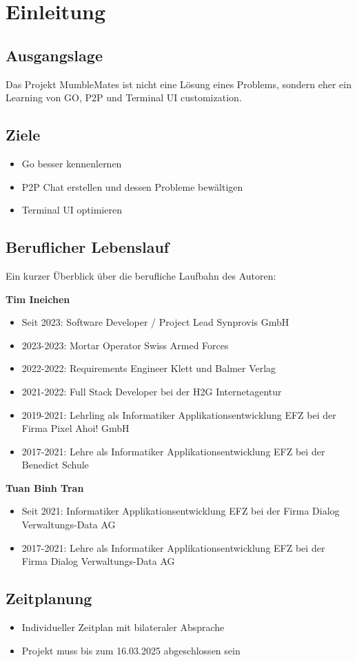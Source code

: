 \section{Einleitung}



\subsection{Ausgangslage}
    Das Projekt MumbleMates ist nicht eine Lösung eines Problems, sondern eher ein Learning von GO, P2P und Terminal UI customization.

\subsection{Ziele}
\begin{itemize}
    \item Go besser kennenlernen
    \item P2P Chat erstellen und dessen Probleme bewältigen
    \item Terminal UI optimieren
\end{itemize}

\subsection{Beruflicher Lebenslauf}

Ein kurzer Überblick über die berufliche Laufbahn des Autoren:


\textbf{Tim Ineichen}
\begin{itemize}
    \item Seit 2023: Software Developer / Project Lead Synprovis GmbH
    \item 2023-2023: Mortar Operator Swiss Armed Forces
    \item 2022-2022: Requirements Engineer Klett und Balmer Verlag
    \item 2021-2022: Full Stack Developer bei der H2G Internetagentur
    \item 2019-2021: Lehrling als Informatiker Applikationsentwicklung EFZ bei der Firma Pixel Ahoi! GmbH
    \item 2017-2021: Lehre als Informatiker Applikationsentwicklung EFZ bei der Benedict Schule
\end{itemize}

\textbf{Tuan Binh Tran}
\begin{itemize}
    \item Seit 2021: Informatiker Applikationsentwicklung EFZ bei der Firma Dialog Verwaltungs-Data AG
    \item 2017-2021: Lehre als Informatiker Applikationsentwicklung EFZ bei der Firma Dialog Verwaltungs-Data AG
\end{itemize}

\subsection{Zeitplanung}
\begin{itemize}
    \item Individueller Zeitplan mit bilateraler Absprache
    \item Projekt muss bis zum 16.03.2025 abgeschlossen sein
\end{itemize}

\newpage
